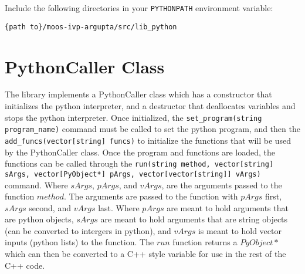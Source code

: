 \documentclass[onecolumn,letterpaper,11pt]{article}
\begin{document}
	Include the following directories in your \texttt{PYTHONPATH} environment variable: 
	
	\begin{center}
		\vspace{0.15in}
		\texttt{\{path to\}/moos-ivp-argupta/src/lib\_python} \\
		\vspace{0.15in}
	\end{center}


	\section{PythonCaller Class}
	
	The library implements a PythonCaller class which has a constructor that initializes the python interpreter, and a destructor that deallocates variables and stops the python interpreter. Once initialized, the \texttt{set\_program(string program\_name)} command must be called to set the python program, and then the \texttt{add\_funcs(vector[string] funcs)} to initialize the functions that will be used by the PythonCaller class. Once the program and functions are loaded, the functions can be called through the \texttt{run(string method, vector[string] sArgs, vector[PyObject*] pArgs, vector[vector[string]] vArgs)} command. Where $sArgs$, $pArgs$, and $vArgs$, are the arguments passed to the function $method$. The arguments are passed to the function with $pArgs$ first, $sArgs$ second, and $vArgs$ last. Where $pArgs$ are meant to hold arguments that are python objects, $sArgs$ are meant to hold arguments that are string objects (can be converted to intergers in python), and $vArgs$ is meant to hold vector inputs (python lists) to the function. The $run$ function returns a $PyObject *$ which can then be converted to a C++ style variable for use in the rest of the C++ code. 
	
\end{document}
